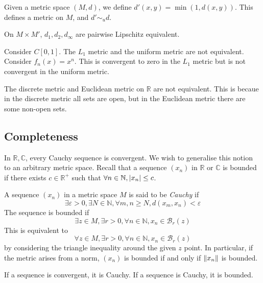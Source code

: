 \begin{example}
    Given a metric space \( (M,d) \), we define \( d'(x,y) = \min(1,d(x,y)) \).
    This defines a metric on \( M \), and \( d' \sim_u d \).
\end{example}
\begin{example}
    On \( M \times M' \), \( d_1, d_2, d_\infty \) are pairwise Lipschitz equivalent.
\end{example}
\begin{example}
    Consider \( C[0,1] \).
    The \( L_1 \) metric and the uniform metric are not equivalent.
    Consider \( f_n(x) = x^n \).
    This is convergent to zero in the \( L_1 \) metric but is not convergent in the uniform metric.
\end{example}
\begin{example}
    The discrete metric and Euclidean metric on \( \mathbb R \) are not equivalent.
    This is becaue in the discrete metric all sets are open, but in the Euclidean metric there are some non-open sets.
\end{example}

\subsection{Completeness}
In \( \mathbb R, \mathbb C \), every Cauchy sequence is convergent.
We wish to generalise this notion to an arbitrary metric space.
Recall that a sequence \( (x_n) \) in \( \mathbb R \) or \( \mathbb C \) is bounded if there exists \( c \in \mathbb R^+ \) such that \( \forall n \in \mathbb N, \abs{x_n} \leq c \).
\begin{definition}
    A sequence \( (x_n) \) in a metric space \( M \) is said to be \textit{Cauchy} if
    \[ \exists \varepsilon > 0, \exists N \in \mathbb N, \forall m,n \geq N, d(x_m,x_n) < \varepsilon \]
    The sequence is bounded if
    \[ \exists z \in M, \exists r > 0, \forall n \in \mathbb N, x_n \in \mathcal B_r(z) \]
    This is equivalent to
    \[ \forall z \in M, \exists r > 0, \forall n \in \mathbb N, x_n \in \mathcal B_r(z) \]
    by considering the triangle inequality around the given \( z \) point.
    In particular, if the metric arises from a norm, \( (x_n) \) is bounded if and only if \( \norm{x_n} \) is bounded.
\end{definition}
\begin{lemma}
    If a sequence is convergent, it is Cauchy.
    If a sequence is Cauchy, it is bounded.
\end{lemma}
